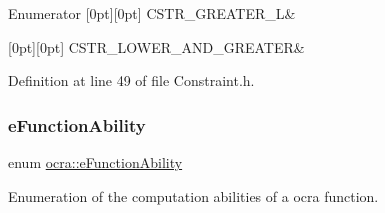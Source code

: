 \begin{DoxyEnumFields}{Enumerator}
[0pt][0pt]{}\hypertarget{namespaceocra_aedff92662043a7f15dc263363db7939ba9e056f131217f1d13cde9b6a1b41f5de}{}\label{namespaceocra_aedff92662043a7f15dc263363db7939ba9e056f131217f1d13cde9b6a1b41f5de} 
C\+S\+T\+R\+\_\+\+G\+R\+E\+A\+T\+E\+R\+\_\+L&\\
\hline

[0pt][0pt]{}\hypertarget{namespaceocra_aedff92662043a7f15dc263363db7939bacde9128c1d54f28ad292f5e61a30d8d1}{}\label{namespaceocra_aedff92662043a7f15dc263363db7939bacde9128c1d54f28ad292f5e61a30d8d1} 
C\+S\+T\+R\+\_\+\+L\+O\+W\+E\+R\+\_\+\+A\+N\+D\+\_\+\+G\+R\+E\+A\+T\+ER&\\
\hline

\end{DoxyEnumFields}


Definition at line 49 of file Constraint.\+h.

\hypertarget{namespaceocra_a40ddbec106a6034cd2047bba9945b568}{}\label{namespaceocra_a40ddbec106a6034cd2047bba9945b568} 
\subsubsection{\texorpdfstring{e\+Function\+Ability}{eFunctionAbility}}
{\footnotesize\ttfamily enum \hyperlink{namespaceocra_a40ddbec106a6034cd2047bba9945b568}{ocra\+::e\+Function\+Ability}}



Enumeration of the computation abilities of a ocra function. 

